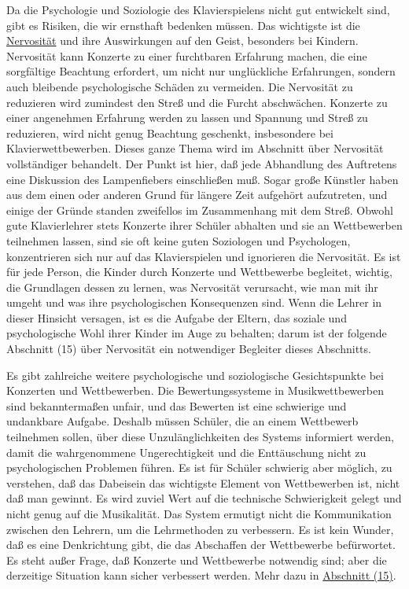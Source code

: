 Da die Psychologie und Soziologie des Klavierspielens nicht gut entwickelt sind, gibt es Risiken, die wir ernsthaft bedenken müssen.
Das wichtigste ist die \hyperref[c1iii15]{Nervosität} und ihre Auswirkungen auf den Geist, besonders bei Kindern.
Nervosität kann Konzerte zu einer furchtbaren Erfahrung machen, die eine sorgfältige Beachtung erfordert, um nicht nur unglückliche Erfahrungen, sondern auch bleibende psychologische Schäden zu vermeiden.
Die Nervosität zu reduzieren wird zumindest den Streß und die Furcht abschwächen.
Konzerte zu einer angenehmen Erfahrung werden zu lassen und Spannung und Streß zu reduzieren, wird nicht genug Beachtung geschenkt, insbesondere bei Klavierwettbewerben.
Dieses ganze Thema wird im Abschnitt über Nervosität vollständiger behandelt.
Der Punkt ist hier, daß jede Abhandlung des Auftretens eine Diskussion des Lampenfiebers einschließen muß.
Sogar große Künstler haben aus dem einen oder anderen Grund für längere Zeit aufgehört aufzutreten, und einige der Gründe standen zweifellos im Zusammenhang mit dem Streß.
Obwohl gute Klavierlehrer stets Konzerte ihrer Schüler abhalten und sie an Wettbewerben teilnehmen lassen, sind sie oft keine guten Soziologen und Psychologen, konzentrieren sich nur auf das Klavierspielen und ignorieren die Nervosität.
Es ist für jede Person, die Kinder durch Konzerte und Wettbewerbe begleitet, wichtig, die Grundlagen dessen zu lernen, was Nervosität verursacht, wie man mit ihr umgeht und was ihre psychologischen Konsequenzen sind.
Wenn die Lehrer in dieser Hinsicht versagen, ist es die Aufgabe der Eltern, das soziale und psychologische Wohl ihrer Kinder im Auge zu behalten; darum ist der folgende Abschnitt (15) über Nervosität ein notwendiger Begleiter dieses Abschnitts.

Es gibt zahlreiche weitere psychologische und soziologische Gesichtspunkte bei Konzerten und Wettbewerben.
Die Bewertungssysteme in Musikwettbewerben sind bekanntermaßen unfair, und das Bewerten ist eine schwierige und undankbare Aufgabe.
Deshalb müssen Schüler, die an einem Wettbewerb teilnehmen sollen, über diese Unzulänglichkeiten des Systems informiert werden, damit die wahrgenommene Ungerechtigkeit und die Enttäuschung nicht zu psychologischen Problemen führen.
Es ist für Schüler schwierig aber möglich, zu verstehen, daß das Dabeisein das wichtigste Element von Wettbewerben ist, nicht daß man gewinnt.
Es wird zuviel Wert auf die technische Schwierigkeit gelegt und nicht genug auf die Musikalität.
Das System ermutigt nicht die Kommunikation zwischen den Lehrern, um die Lehrmethoden zu verbessern.
Es ist kein Wunder, daß es eine Denkrichtung gibt, die das Abschaffen der Wettbewerbe befürwortet.
Es steht außer Frage, daß Konzerte und Wettbewerbe notwendig sind; aber die derzeitige Situation kann sicher verbessert werden.
Mehr dazu in \hyperref[c1iii15]{Abschnitt (15)}.


